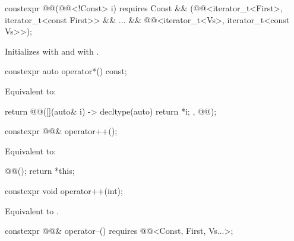 %
\begin{itemdecl}
constexpr @@(@@<!Const> i) requires Const &&
  (@@<iterator_t<First>, iterator_t<const First>> &&
    ... && @@<iterator_t<Vs>, iterator_t<const Vs>>);
\end{itemdecl}

\begin{itemdescr}
\pnum
\effects
Initializes
 with  and
 with .
\end{itemdescr}

%
\begin{itemdecl}
constexpr auto operator*() const;
\end{itemdecl}

\begin{itemdescr}
\pnum
\effects
Equivalent to:
\begin{codeblock}
return @@([](auto& i) -> decltype(auto) { return *i; }, @@);
\end{codeblock}
\end{itemdescr}

%
\begin{itemdecl}
constexpr @@& operator++();
\end{itemdecl}

\begin{itemdescr}
\pnum
\effects
Equivalent to:
\begin{codeblock}
@@();
return *this;
\end{codeblock}
\end{itemdescr}

%
\begin{itemdecl}
constexpr void operator++(int);
\end{itemdecl}

\begin{itemdescr}
\pnum
\effects
Equivalent to .
\end{itemdescr}

%
\begin{itemdecl}
constexpr @@& operator--()
  requires @@<Const, First, Vs...>;
\end{itemdecl}

